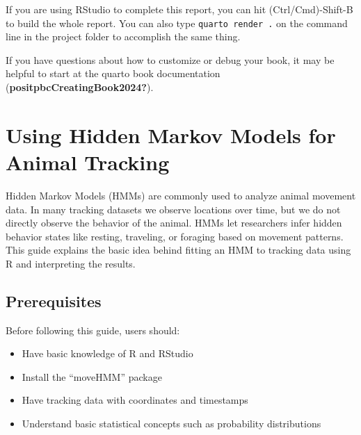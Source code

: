\documentclass[
  letterpaper,
  DIV=11,
  numbers=noendperiod]{scrreprt}
\providecommand{\tightlist}{%
  \setlength{\itemsep}{0pt}\setlength{\parskip}{0pt}}
\begin{document}
\begin{tcolorbox}[enhanced jigsaw, colback=white, colbacktitle=quarto-callout-caution-color!10!white, coltitle=black, opacitybacktitle=0.6, bottomrule=.15mm, colframe=quarto-callout-caution-color-frame, toptitle=1mm, leftrule=.75mm, opacityback=0, bottomtitle=1mm, toprule=.15mm, rightrule=.15mm, titlerule=0mm, breakable, left=2mm, arc=.35mm, title=\textcolor{quarto-callout-caution-color}{\faFire}\hspace{0.5em}{Building the report}]

If you are using RStudio to complete this report, you can hit
(Ctrl/Cmd)-Shift-B to build the whole report. You can also type
\texttt{quarto\ render\ .} on the command line in the project folder to
accomplish the same thing.

If you have questions about how to customize or debug your book, it may
be helpful to start at the quarto book documentation
(\textbf{positpbcCreatingBook2024?}).

\end{tcolorbox}


\chapter{Using Hidden Markov Models for Animal
Tracking}\label{using-hidden-markov-models-for-animal-tracking}

Hidden Markov Models (HMMs) are commonly used to analyze animal movement
data. In many tracking datasets we observe locations over time, but we
do not directly observe the behavior of the animal. HMMs let researchers
infer hidden behavior states like resting, traveling, or foraging based
on movement patterns. This guide explains the basic idea behind fitting
an HMM to tracking data using R and interpreting the results.

\section{Prerequisites}\label{prerequisites}

Before following this guide, users should:

\begin{itemize}
\tightlist
\item
  Have basic knowledge of R and RStudio
\item
  Install the ``moveHMM'' package
\item
  Have tracking data with coordinates and timestamps
\item
  Understand basic statistical concepts such as probability
  distributions
\end{itemize}
\end{document}
